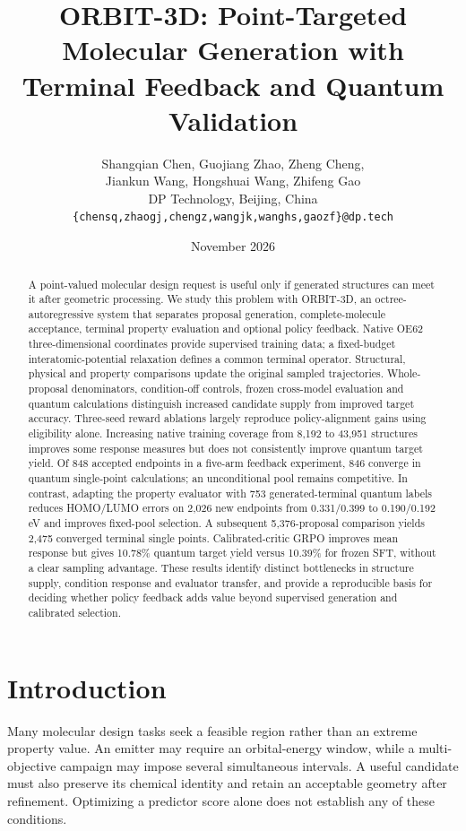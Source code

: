 \documentclass[11pt,a4paper]{article}
\title{\textbf{ORBIT-3D: Point-Targeted Molecular Generation with
Terminal Feedback and Quantum Validation}}
\author{Shangqian Chen, Guojiang Zhao, Zheng Cheng,\\
Jiankun Wang, Hongshuai Wang, Zhifeng Gao\\[3pt]
\small DP Technology, Beijing, China\\
\small\texttt{\{chensq,zhaogj,chengz,wangjk,wanghs,gaozf\}@dp.tech}}
\date{November 2026}
\begin{document}
\maketitle
\begin{abstract}
A point-valued molecular design request is useful only if generated
structures can meet it after geometric processing. We study this problem
with ORBIT-3D, an octree-autoregressive system that separates proposal
generation, complete-molecule acceptance, terminal property evaluation
and optional policy feedback. Native OE62 three-dimensional coordinates
provide supervised training data; a fixed-budget interatomic-potential
relaxation defines a common terminal operator. Structural, physical and
property comparisons update the original sampled trajectories.
Whole-proposal denominators, condition-off controls, frozen cross-model
evaluation and quantum calculations distinguish increased candidate
supply from improved target accuracy. Three-seed reward ablations
largely reproduce policy-alignment gains using eligibility alone.
Increasing native training coverage from 8,192 to 43,951 structures
improves some response measures but does not consistently improve
quantum target yield. Of 848 accepted endpoints in a five-arm feedback
experiment, 846 converge in quantum single-point calculations; an
unconditional pool remains competitive. In contrast, adapting the
property evaluator with 753 generated-terminal quantum labels reduces
HOMO/LUMO errors on 2,026 new endpoints from 0.331/0.399 to 0.190/0.192
eV and improves fixed-pool selection. A subsequent 5,376-proposal
comparison yields 2,475 converged terminal single points.
Calibrated-critic GRPO improves mean response but gives 10.78\% quantum
target yield versus 10.39\% for frozen SFT, without a clear sampling
advantage. These results identify distinct bottlenecks in structure
supply, condition response and evaluator transfer, and provide a
reproducible basis for deciding whether policy feedback adds value
beyond supervised generation and calibrated selection.
\end{abstract}
\setcounter{figure}{-1}
\section{Introduction}\label{introduction}

Many molecular design tasks seek a feasible region rather than an
extreme property value. An emitter may require an orbital-energy window,
while a multi-objective campaign may impose several simultaneous
intervals. A useful candidate must also preserve its chemical identity
and retain an acceptable geometry after refinement. Optimizing a
predictor score alone does not establish any of these conditions.
\end{document}
